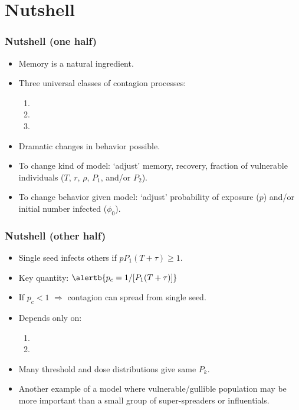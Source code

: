 \section{Nutshell}

\begin{frame}
  \frametitle{Nutshell (one half)}

  \begin{itemize}
  \item<1-> 
    Memory is a natural ingredient. %
  \item<2->
    Three universal classes of contagion processes:
    \begin{enumerate}
    \item 
    \item 
    \item 
    \end{enumerate}
  \item<3->
    Dramatic changes in behavior possible.
  \item<4->
    To change kind of model: `adjust' memory, recovery, fraction
    of vulnerable individuals ($T$, $r$, $\rho$, $P_1$, and/or $P_2$).
  \item<5->
    To change behavior given model: `adjust' probability
    of exposure ($p$) and/or initial number infected ($\phi_0$).
  \end{itemize}
\end{frame}

\begin{frame}
  \frametitle{Nutshell (other half)}

  \begin{itemize}
  \item<1-> 
    Single seed infects others if $p P_1 (T + \tau) \ge 1$.
  \item<2-> 
    Key quantity: $\alertb{p_c = 1/[P_1 (T + \tau)]}$
  \item<3-> 
    If $p_c < 1$ $\Rightarrow$ contagion can spread from single seed.
  \item<4->
    Depends only on:
    \begin{enumerate}
    \item 
    \item 
    \end{enumerate}
  \item<5->
    Many threshold and dose distributions give same $P_k$.
  \item<6->
    Another example of a model where
    vulnerable/gullible population may be more important than
    a small group of super-spreaders or influentials.
  \end{itemize}

\end{frame}

